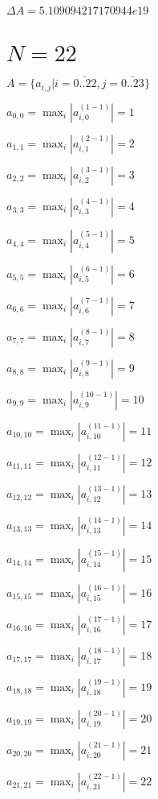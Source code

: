 \documentclass[a4paper,12pt]{article}
\begin{document}
$\Delta A = 5.109094217170944e19$



\section{ $N = 22$ }
$A = \{ a _{ i, j } | i = \bar { 0..22 }, j = \bar { 0..23 } \}$

$a _{ 0, 0 } =  \max _i |a _{ i, 0 } ^{ (1 - 1) } | = 1$

$a _{ 1, 1 } =  \max _i |a _{ i, 1 } ^{ (2 - 1) } | = 2$

$a _{ 2, 2 } =  \max _i |a _{ i, 2 } ^{ (3 - 1) } | = 3$

$a _{ 3, 3 } =  \max _i |a _{ i, 3 } ^{ (4 - 1) } | = 4$

$a _{ 4, 4 } =  \max _i |a _{ i, 4 } ^{ (5 - 1) } | = 5$

$a _{ 5, 5 } =  \max _i |a _{ i, 5 } ^{ (6 - 1) } | = 6$

$a _{ 6, 6 } =  \max _i |a _{ i, 6 } ^{ (7 - 1) } | = 7$

$a _{ 7, 7 } =  \max _i |a _{ i, 7 } ^{ (8 - 1) } | = 8$

$a _{ 8, 8 } =  \max _i |a _{ i, 8 } ^{ (9 - 1) } | = 9$

$a _{ 9, 9 } =  \max _i |a _{ i, 9 } ^{ (10 - 1) } | = 10$

$a _{ 10, 10 } =  \max _i |a _{ i, 10 } ^{ (11 - 1) } | = 11$

$a _{ 11, 11 } =  \max _i |a _{ i, 11 } ^{ (12 - 1) } | = 12$

$a _{ 12, 12 } =  \max _i |a _{ i, 12 } ^{ (13 - 1) } | = 13$

$a _{ 13, 13 } =  \max _i |a _{ i, 13 } ^{ (14 - 1) } | = 14$

$a _{ 14, 14 } =  \max _i |a _{ i, 14 } ^{ (15 - 1) } | = 15$

$a _{ 15, 15 } =  \max _i |a _{ i, 15 } ^{ (16 - 1) } | = 16$

$a _{ 16, 16 } =  \max _i |a _{ i, 16 } ^{ (17 - 1) } | = 17$

$a _{ 17, 17 } =  \max _i |a _{ i, 17 } ^{ (18 - 1) } | = 18$

$a _{ 18, 18 } =  \max _i |a _{ i, 18 } ^{ (19 - 1) } | = 19$

$a _{ 19, 19 } =  \max _i |a _{ i, 19 } ^{ (20 - 1) } | = 20$

$a _{ 20, 20 } =  \max _i |a _{ i, 20 } ^{ (21 - 1) } | = 21$

$a _{ 21, 21 } =  \max _i |a _{ i, 21 } ^{ (22 - 1) } | = 22$
\end{document}
